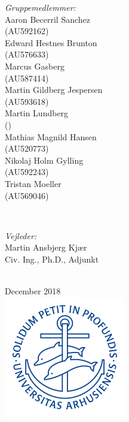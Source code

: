 \begin{titlepage}
\begin{minipage}{0.4\textwidth}
\begin{flushleft} \small
\emph{Gruppemedlemmer:}
\\Aaron Becerril Sanchez\\ (AU592162)
\\Edward Hestnes Brunton\\ (AU576633)
\\Marcus Gasberg\\ (AU587414) 
\\Martin Gildberg Jespersen\\ (AU593618) 
\\Martin Lundberg\\ () 
\\Mathias Magnild Hansen\\ (AU520773)
\\Nikolaj Holm Gylling\\ (AU592243)
\\Tristan Moeller\\ (AU569046)
\end{flushleft}
\end{minipage}
~
\begin{minipage}{0.4\textwidth}
\begin{flushright} \small
\emph{Vejleder:} \\
Martin Ansbjerg Kjær \\ Civ. Ing., Ph.D., Adjunkt %
\end{flushright}
\end{minipage}\\[1cm]



{\large December 2018}\\[1cm] %


\includegraphics{Setup/graphics/AU.png}\\[1cm] %

\vfill
\end{titlepage}
